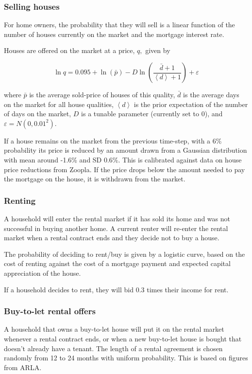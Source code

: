 \documentclass{article}
\begin{document}
\subsubsection{Selling houses}

For home owners, the probability that they will sell is a linear function of the number of houses currently on the market and the mortgage interest rate.

Houses are offered on the market at a price, $q,$ given by

\begin{equation}
\ln q=0.095+\ln (\bar{p})-D\ln \left( \frac{\bar{d}+1}{\left\langle
d\right\rangle +1}\right) +\varepsilon
\end{equation}

\bigskip

where $\bar{p}$ is the average sold-price of houses of this quality, $\bar{d}
$ is the average days on the market for all house qualities, $\left\langle
d\right\rangle $ is the prior expectation of the number of days on the
market, $D$ is a tunable parameter (currently set to 0), and $\varepsilon
=N(0,0.01^{2})$.

If a house remains on the market from the previous time-step, with a 6\%
probability its price is reduced by an amount drawn from a Gaussian
distribution with mean around -1.6\% and SD 0.6\%. This is calibrated
against data on house price reductions from Zoopla. If the price drops below the amount needed to pay the mortgage on the house, it is withdrawn from the
market.

\subsubsection{Renting}

A household will enter the rental market if it has sold its home and was not
successful in buying another home. A current renter will re-enter the rental
market when a rental contract ends and they decide not to buy a house.

The probability of deciding to rent/buy is given by a logistic curve, based on the cost of renting against the cost of a mortgage payment and expected capital appreciation of the house.

If a household decides to rent, they will bid 0.3 times their income for rent.

\subsubsection{Buy-to-let rental offers}
A household that owns a buy-to-let house will put it on the rental market
whenever a rental contract ends, or when a new buy-to-let house is bought
that doesn't already have a tenant. The length of a rental agreement is
chosen randomly from 12 to 24 months with uniform probability. This is based
on figures from ARLA.
\end{document}
